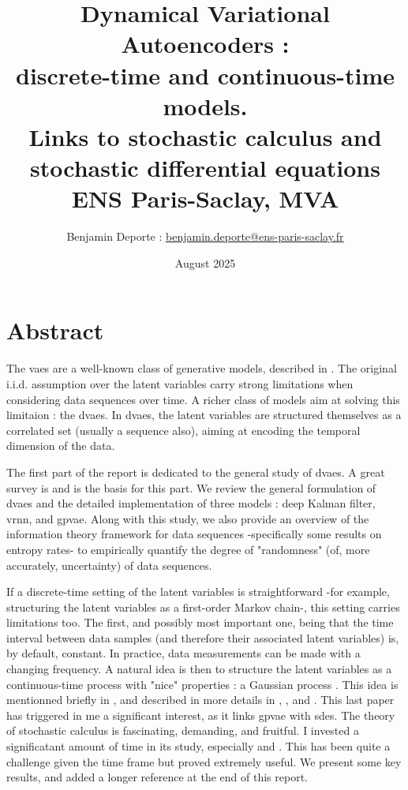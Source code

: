 \documentclass[twoside,11pt]{report}
\title{Dynamical Variational Autoencoders :\\ discrete-time and continuous-time models.\\ Links to stochastic calculus and stochastic differential equations\\
\vspace{2cm}
{\Large{ENS Paris-Saclay, MVA}}}
\author{
Benjamin Deporte : \href{mailto:benjamin.deporte@ens-paris-saclay.fr}{benjamin.deporte@ens-paris-saclay.fr}%
}
\date{August 2025}
\begin{document}
\everymath{\displaystyle}
\maketitle
\chapter*{Abstract}

The \glspl{vae} are a well-known class of generative models, described in \cite{kingma_introduction_2019}. The original i.i.d.
assumption over the latent variables carry strong limitations when considering data sequences over time. A richer
class of models aim at solving this limitaion : the \glspl{dvae}. In \glspl{dvae}, the latent variables are structured themselves as a correlated set (usually a sequence also),
 aiming at encoding the temporal dimension of the data. 

The first part of the report is dedicated to the general study of \glspl{dvae}. A great survey is \cite{girin_dynamical_2022} and is the basis for this part. 
We review the general formulation of \glspl{dvae} and the detailed implementation of three models :  deep Kalman filter, \gls{vrnn}, and \gls{gpvae}. 
Along with this study, we also provide an overview of the information theory framework for data sequences -specifically some results on entropy rates-
 to empirically  quantify the degree of "randomness" (of, more accurately, uncertainty) of data sequences.


If a discrete-time setting of the latent variables is straightforward -for example, structuring the latent variables as a first-order Markov chain-, this setting carries limitations too. 
The first, and possibly most important one, being that the time interval between data samples (and therefore their associated latent variables) is, by default, constant. In practice, data measurements can be made 
with a changing frequency. A natural idea is then to structure the latent variables as a continuous-time process with "nice" properties : a Gaussian process \cite{rasmussen_gaussian_2008}. 
This idea is mentionned briefly in \cite{girin_dynamical_2022}, and described in more details in \cite{casale_gaussian_2018}, \cite{fortuin_gp-vae:_2020}, \cite{titsias_bayesian_2010} and \cite{zhu_markovian_2023}. 
This last paper has triggered in me a significant interest, as it links \gls{gpvae} with \glspl{sde}. The theory of stochastic calculus is fascinating, demanding, and fruitful.
I invested a significatant amount of time in its study, especially \cite{mouvement-brownien-calcul-ito} and \cite{sarkka_applied_2019}.
This has been quite a challenge given the time frame but proved extremely useful. We present some key results,
and added a longer reference at the end of this report.
\end{document}
